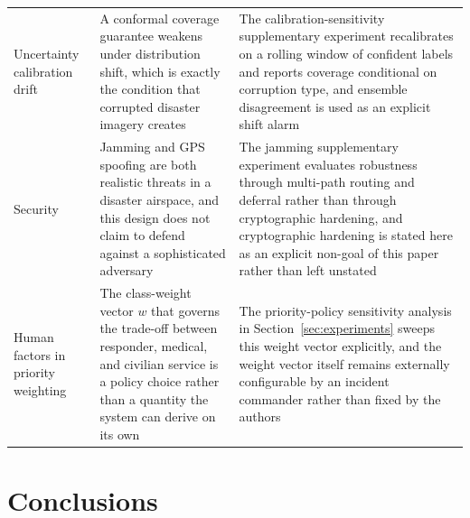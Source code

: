 \documentclass[drones,article,submit,moreauthors]{Definitions/mdpi}
\begin{document}
\begin{table}[H]
\begin{tabular}{p{2.8cm}p{5.0cm}p{5.0cm}}
Uncertainty calibration drift & A conformal coverage guarantee weakens under distribution shift, which is exactly the condition that corrupted disaster imagery creates & The calibration-sensitivity supplementary experiment recalibrates on a rolling window of confident labels and reports coverage conditional on corruption type, and ensemble disagreement is used as an explicit shift alarm \\
Security & Jamming and GPS spoofing are both realistic threats in a disaster airspace, and this design does not claim to defend against a sophisticated adversary & The jamming supplementary experiment evaluates robustness through multi-path routing and deferral rather than through cryptographic hardening, and cryptographic hardening is stated here as an explicit non-goal of this paper rather than left unstated \\
Human factors in priority weighting & The class-weight vector $w$ that governs the trade-off between responder, medical, and civilian service is a policy choice rather than a quantity the system can derive on its own & The priority-policy sensitivity analysis in Section~\ref{sec:experiments} sweeps this weight vector explicitly, and the weight vector itself remains externally configurable by an incident commander rather than fixed by the authors \\
\bottomrule
\end{tabular}
\end{table}

\section{Conclusions}
\label{sec:conclusions}
\end{document}
